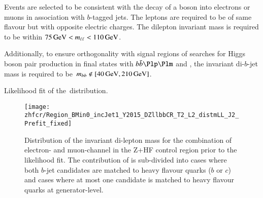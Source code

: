 Events are selected to be consistent with the decay of a \PZ boson
into electrons or muons in association with $b$-tagged jets. The
leptons are required to be of same flavour but with opposite electric
charges. The dilepton invariant mass is required to be within
$\SI{75}{\ensuremath{\text{GeV}}} < m_{\ell\ell} < \SI{110}{\ensuremath{\text{GeV}}}$.

Additionally, to ensure orthogonality with signal regions of searches
for Higgs boson pair production in final states with $\bbbar\Plp\Plm$
and \MET, the invariant di-$b$-jet mass is required to
be~$\mBB \not\in [\SI{40}{\GeV}, \SI{210}{\GeV}]$.

Likelihood fit of the~\mll distribution.

\begin{figure}[htbp]
  \centering

  \texttt{[image: zhfcr/Region\_BMin0\_incJet1\_Y2015\_DZllbbCR\_T2\_L2\_distmLL\_J2\_Prefit\_fixed]}

  \caption{Distribution of the invariant di-lepton mass for the
    combination of electron- and muon-channel in the Z+HF control
    region prior to the likelihood fit. The contribution of \Zjets is
    sub-divided into cases where both $b$-jet candidates are matched
    to heavy flavour quarks ($b$ or $c$) and cases where at most one
    candidate is matched to heavy flavour quarks at generator-level.}
  \label{fig:zcr_mll_prefit}
\end{figure}



